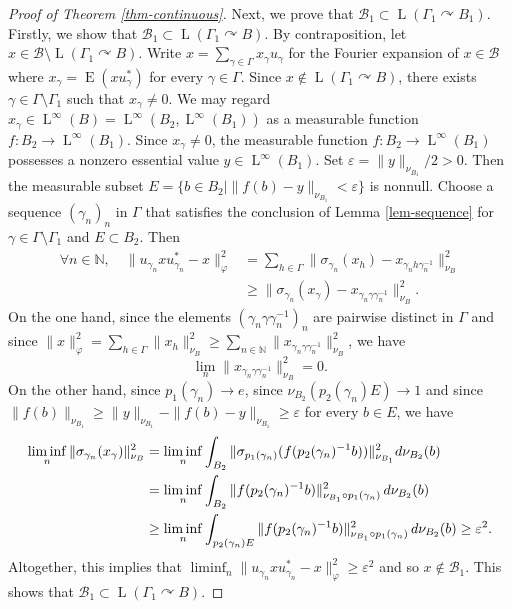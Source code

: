 \documentclass[11pt]{article}
\theoremstyle{definition}
\newcommand{\N}{\mathbb{N}}
\DeclareMathOperator{\rE}{ E}
\DeclareMathOperator{\rL}{L}
\begin{document}
\begin{proof}[Proof of Theorem \ref{thm-continuous}]
Next, we prove that $\mathscr B_1 \subset \rL(\Gamma_1 \curvearrowright B_1)$. Firstly, we show that $\mathscr B_1 \subset \rL(\Gamma_1 \curvearrowright B)$. By contraposition, let $x \in \mathscr B \setminus\rL(\Gamma_1 \curvearrowright B)$. Write $x = \sum_{\gamma \in \Gamma} x_\gamma u_\gamma$ for the Fourier expansion of $x \in \mathscr B$ where $x_\gamma = \rE(xu_\gamma^*)$ for every $\gamma \in \Gamma$. Since $x \not\in \rL(\Gamma_1 \curvearrowright B)$, there exists $\gamma \in \Gamma \setminus \Gamma_1$ such that $x_\gamma \neq 0$. We may regard $x_\gamma \in \rL^\infty(B) = \rL^\infty(B_2, \rL^\infty(B_1))$ as a measurable function $f : B_2 \to \rL^\infty(B_1)$. Since $x_\gamma \neq 0$, the measurable function \hbox{$f : B_2 \to \rL^\infty(B_1)$} possesses a nonzero essential value $y\!\in\!\rL^\infty(B_1)$. Set \hbox{$\varepsilon \!=\! \|y\|_{\nu_{B_1}}/2 \!>\! 0$}. Then the measurable subset $E = \{b \in B_2 \mid \|f(b) - y\|_{\nu_{B_1}} < \varepsilon\}$ is nonnull. Choose a sequence $(\gamma_n)_n$ in $\Gamma$ that satisfies the conclusion of Lemma \ref{lem-sequence} for $\gamma \in \Gamma \setminus \Gamma_1$ and $E \subset B_2$. Then
\begin{align*}
\forall n \in \N, \quad \|u_{\gamma_n} x u_{\gamma_n}^* - x\|_\varphi^2 &= \sum_{h \in \Gamma} \|\sigma_{\gamma_n}(x_h) - x_{\gamma_n h \gamma_n^{-1}}\|_{\nu_B}^2 \\
& \geq \|\sigma_{\gamma_n}(x_\gamma) - x_{\gamma_n \gamma \gamma_n^{-1}}\|_{\nu_B}^2.
\end{align*}
On the one hand, since the elements $(\gamma_n \gamma \gamma_n^{-1})_n$ are pairwise distinct in $\Gamma$ and since $\|x\|_\varphi^2 = \sum_{h \in \Gamma} \|x_h\|_{\nu_B}^2 \geq \sum_{n \in \N} \|x_{\gamma_n \gamma \gamma_n^{-1}}\|_{\nu_B}^2$, we have
\[
\lim_n \|x_{\gamma_n \gamma \gamma_n^{-1}}\|_{\nu_B}^2 = 0.
\]
On the other hand, since $p_1(\gamma_n) \to e$, since $\nu_{B_2}(p_2(\gamma_n) E) \to 1$ and since $\|f(b)\|_{\nu_{B_1}} \geq \|y\|_{\nu_{B_1}} - \|f(b) - y\|_{\nu_{B_1}} \geq \varepsilon$ for every $b \in E$, we have
\begin{align*}
\liminf_n\|\sigma_{\gamma_n}(x_\gamma)\|_{ \nu_B}^2 &= \liminf_n \int_{B_2} \|\sigma_{p_1(\gamma_n)}(f(p_2(\gamma_n)^{-1} b))\|^2_{\nu_{B_1}} {\rm d}\nu_{B_2}(b) \\
&= \liminf_n \int_{B_2} \|f(p_2(\gamma_n)^{-1} b)\|^2_{\nu_{B_1} \circ p_1(\gamma_n)} \, {\rm d}\nu_{B_2}(b) \\
&\geq \liminf_n \int_{p_2(\gamma_n) E} \|f(p_2(\gamma_n)^{-1} b)\|^2_{\nu_{B_1} \circ p_1(\gamma_n)} \, {\rm d}\nu_{B_2}(b) \geq \varepsilon^2.
\end{align*}
Altogether, this implies that $\liminf_n \|u_{\gamma_n} x u_{\gamma_n}^* - x\|_\varphi^2 \geq \varepsilon^2$ and so $x \not\in \mathscr B_1$. This shows that $\mathscr B_1 \subset \rL(\Gamma_1 \curvearrowright B)$.


\end{proof}
\end{document}
